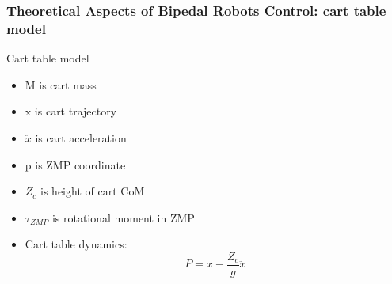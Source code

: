 \documentclass{beamer}
\begin{document}

	\begin{frame}
		\frametitle{Theoretical Aspects of Bipedal Robots Control: cart table model}
		\begin{block}{Cart table model}
			\begin{itemize}
				\item
					M is cart mass
				\item
					x is cart trajectory
				\item
					$\ddot{x}$ is cart acceleration
				\item
					p is ZMP coordinate
				\item
					$Z_c$ is height of cart CoM
				\item
					$\tau_{ZMP}$ is rotational moment in ZMP
				\item
					Cart table dynamics:
					\begin{equation}
						P = x - \dfrac{Z_c}{g} \ddot{x}
					\end{equation}		
			\end{itemize}
		\end{block}
	\end{frame}

\end{document}
